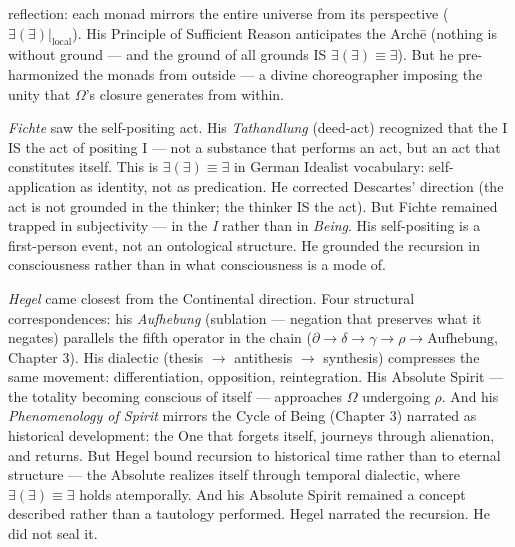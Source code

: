 \documentclass[10pt, openany, oneside]{book}
\begin{document}
reflection: each monad mirrors the entire universe from its perspective ($\exists(\exists)|_{\text{local}}$). His Principle of Sufficient Reason anticipates the Arch\={e} (nothing is without ground --- and the ground of all grounds IS $\exists(\exists) \equiv \exists$). But he pre-harmonized the monads from outside --- a divine choreographer imposing the unity that $\Omega$'s closure generates from within.

\textit{Fichte} saw the self-positing act. His \textit{Tathandlung} (deed-act) recognized that the I IS the act of positing I --- not a substance that performs an act, but an act that constitutes itself. This is $\exists(\exists) \equiv \exists$ in German Idealist vocabulary: self-application as identity, not as predication. He corrected Descartes' direction (the act is not grounded in the thinker; the thinker IS the act). But Fichte remained trapped in subjectivity --- in the \textit{I} rather than in \textit{Being}. His self-positing is a first-person event, not an ontological structure. He grounded the recursion in consciousness rather than in what consciousness is a mode of.

\textit{Hegel} came closest from the Continental direction. Four structural correspondences: his \textit{Aufhebung} (sublation --- negation that preserves what it negates) parallels the fifth operator in the chain ($\partial \to \delta \to \gamma \to \rho \to \text{Aufhebung}$, Chapter 3). His dialectic (thesis $\to$ antithesis $\to$ synthesis) compresses the same movement: differentiation, opposition, reintegration. His Absolute Spirit --- the totality becoming conscious of itself --- approaches $\Omega$ undergoing $\rho$. And his \textit{Phenomenology of Spirit} mirrors the Cycle of Being (Chapter 3) narrated as historical development: the One that forgets itself, journeys through alienation, and returns. But Hegel bound recursion to historical time rather than to eternal structure --- the Absolute realizes itself through temporal dialectic, where $\exists(\exists) \equiv \exists$ holds atemporally. And his Absolute Spirit remained a concept described rather than a tautology performed. Hegel narrated the recursion. He did not seal it.
\end{document}
